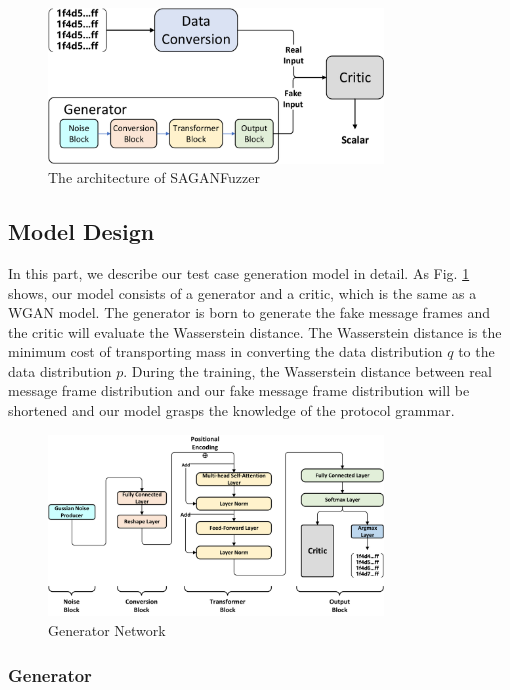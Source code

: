 \begin{figure}[htbp]   %
	\centering 
	\includegraphics[width=3.5in]{FigSAGANFuzzer_model.pdf}
	\caption{The architecture of SAGANFuzzer}
	\label{FigSAGANFuzzer_model}
\end{figure}
\subsection{Model Design} 
\label{sec:model_design} 
In this part, we describe our test case generation model in detail. As Fig. \ref{FigSAGANFuzzer_model} shows, our model consists of a generator and a critic, which is the same as a WGAN model. The generator is born to generate the fake message frames and the critic will evaluate the Wasserstein distance. The Wasserstein distance is the minimum cost of transporting mass in converting the data distribution $q$ to the data distribution $p$. During the training, the Wasserstein distance between real message frame distribution and our fake message frame distribution will be shortened and our model grasps the knowledge of the protocol grammar.


\begin{figure}[htbp]   %
	\centering 
	\includegraphics[width=3.5in]{FigSAGANFuzzer_Generator.pdf}
	\caption{Generator Network}
	\label{FigSAGANFuzzer_Generator}
\end{figure}
\subsubsection{\textbf{Generator}}


